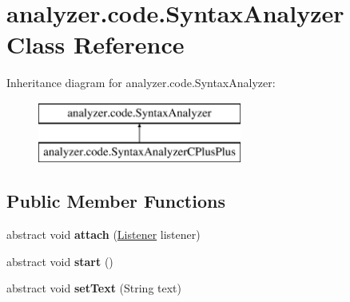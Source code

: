 \hypertarget{classanalyzer_1_1code_1_1SyntaxAnalyzer}{}\section{analyzer.\+code.\+Syntax\+Analyzer Class Reference}
\label{classanalyzer_1_1code_1_1SyntaxAnalyzer}
Inheritance diagram for analyzer.\+code.\+Syntax\+Analyzer\+:\begin{figure}[H]
\begin{center}
\leavevmode
\includegraphics[height=2.000000cm]{classanalyzer_1_1code_1_1SyntaxAnalyzer}
\end{center}
\end{figure}
\subsection*{Public Member Functions}
\begin{DoxyCompactItemize}
\item 
\mbox{\label{classanalyzer_1_1code_1_1SyntaxAnalyzer_a77000f1752e71019a73c2da546510d91}} 
abstract void {\bfseries attach} (\hyperlink{classanalyzer_1_1code_1_1Listener}{Listener} listener)
\item 
\mbox{\label{classanalyzer_1_1code_1_1SyntaxAnalyzer_a5e23e6a26a8931dfdc6b356f73fb1260}} 
abstract void {\bfseries start} ()
\item 
\mbox{\label{classanalyzer_1_1code_1_1SyntaxAnalyzer_ab928134f83adb33bf380ee5f41f27370}} 
abstract void {\bfseries set\+Text} (String text)
\end{DoxyCompactItemize}
